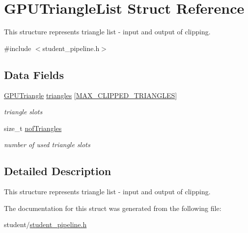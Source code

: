 \hypertarget{structGPUTriangleList}{}\section{G\+P\+U\+Triangle\+List Struct Reference}
\label{structGPUTriangleList}


This structure represents triangle list -\/ input and output of clipping.  




{\ttfamily \#include $<$student\+\_\+pipeline.\+h$>$}

\subsection*{Data Fields}
\begin{DoxyCompactItemize}
\item 
\hyperlink{structGPUTriangle}{G\+P\+U\+Triangle} \hyperlink{structGPUTriangleList_a82e236c3dae30c59dfedd12105bd71a9}{triangles} \mbox{[}\hyperlink{fwd_8h_a50521856e491931b63ecbaa2f90837ec}{M\+A\+X\+\_\+\+C\+L\+I\+P\+P\+E\+D\+\_\+\+T\+R\+I\+A\+N\+G\+L\+ES}\mbox{]}\hypertarget{structGPUTriangleList_a82e236c3dae30c59dfedd12105bd71a9}{}\label{structGPUTriangleList_a82e236c3dae30c59dfedd12105bd71a9}

\begin{DoxyCompactList}\small\item\em triangle slots \end{DoxyCompactList}\item 
size\+\_\+t \hyperlink{structGPUTriangleList_a8bab6c6758e097060186e69fa1560494}{nof\+Triangles}\hypertarget{structGPUTriangleList_a8bab6c6758e097060186e69fa1560494}{}\label{structGPUTriangleList_a8bab6c6758e097060186e69fa1560494}

\begin{DoxyCompactList}\small\item\em number of used triangle slots \end{DoxyCompactList}\end{DoxyCompactItemize}


\subsection{Detailed Description}
This structure represents triangle list -\/ input and output of clipping. 

The documentation for this struct was generated from the following file\+:\begin{DoxyCompactItemize}
\item 
student/\hyperlink{student__pipeline_8h}{student\+\_\+pipeline.\+h}\end{DoxyCompactItemize}
